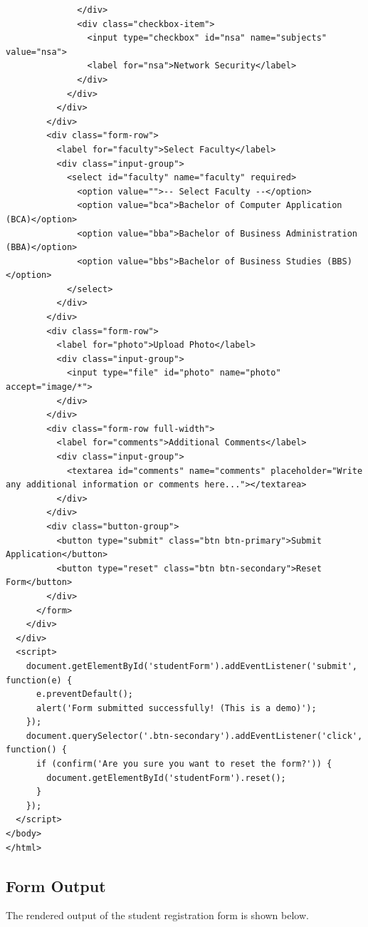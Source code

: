\documentclass[a4paper,12pt]{article}
\begin{document}
\begin{lstlisting}
              </div>
              <div class="checkbox-item">
                <input type="checkbox" id="nsa" name="subjects" value="nsa">
                <label for="nsa">Network Security</label>
              </div>
            </div>
          </div>
        </div>
        <div class="form-row">
          <label for="faculty">Select Faculty</label>
          <div class="input-group">
            <select id="faculty" name="faculty" required>
              <option value="">-- Select Faculty --</option>
              <option value="bca">Bachelor of Computer Application (BCA)</option>
              <option value="bba">Bachelor of Business Administration (BBA)</option>
              <option value="bbs">Bachelor of Business Studies (BBS)</option>
            </select>
          </div>
        </div>
        <div class="form-row">
          <label for="photo">Upload Photo</label>
          <div class="input-group">
            <input type="file" id="photo" name="photo" accept="image/*">
          </div>
        </div>
        <div class="form-row full-width">
          <label for="comments">Additional Comments</label>
          <div class="input-group">
            <textarea id="comments" name="comments" placeholder="Write any additional information or comments here..."></textarea>
          </div>
        </div>
        <div class="button-group">
          <button type="submit" class="btn btn-primary">Submit Application</button>
          <button type="reset" class="btn btn-secondary">Reset Form</button>
        </div>
      </form>
    </div>
  </div>
  <script>
    document.getElementById('studentForm').addEventListener('submit', function(e) {
      e.preventDefault();
      alert('Form submitted successfully! (This is a demo)');
    });
    document.querySelector('.btn-secondary').addEventListener('click', function() {
      if (confirm('Are you sure you want to reset the form?')) {
        document.getElementById('studentForm').reset();
      }
    });
  </script>
</body>
</html>
\end{lstlisting}

\subsection{Form Output}
The rendered output of the student registration form is shown below.
\end{document}
